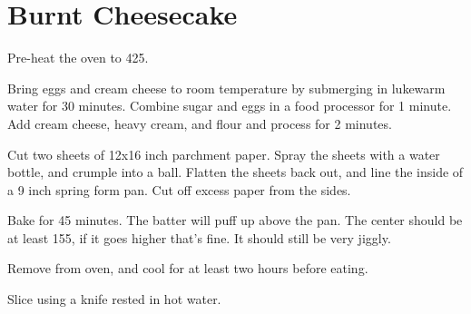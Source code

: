 \section{Burnt Cheesecake}
\begin{recipe}


Pre-heat the oven to 425\degree{}. 


Bring eggs and cream cheese to room temperature by submerging in lukewarm water for 30 minutes. Combine sugar and eggs
in a food processor for 1 minute. Add cream cheese, heavy cream, and flour and process for 2 minutes. 

Cut two sheets of 12x16 inch parchment paper. Spray the sheets with a water bottle, and crumple into a ball. 
Flatten the sheets back out, and line the inside of a 9 inch spring form pan. Cut off excess paper from the sides. 

Bake for 45 minutes. The batter will puff up above the pan. The center should be at least 155\degree, if it goes 
higher that's fine. It should still be very jiggly. 

Remove from oven, and cool for at least two hours before eating.

Slice using a knife rested in hot water. 

\end{recipe}
